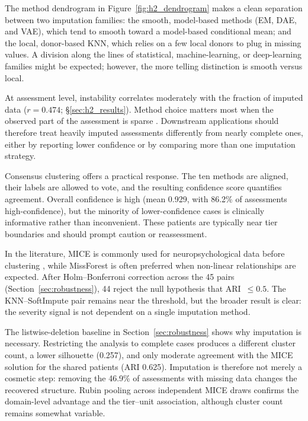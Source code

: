 The method dendrogram in Figure~\ref{fig:h2_dendrogram} makes a clean separation between two imputation families: the smooth, model-based methods (EM, DAE, and VAE), which tend to smooth toward a model-based conditional mean; and the local, donor-based KNN, which relies on a few local donors to plug in missing values. A division along the lines of statistical, machine-learning, or deep-learning families might be expected; however, the more telling distinction is smooth versus local.

At assessment level, instability correlates moderately with the fraction of imputed data ($r = 0.474$; §\ref{sec:h2_results}). Method choice matters most when the observed part of the assessment is sparse \parencite{little2019statistical}. Downstream applications should therefore treat heavily imputed assessments differently from nearly complete ones, either by reporting lower confidence or by comparing more than one imputation strategy.

Consensus clustering offers a practical response. The ten methods are aligned, their labels are allowed to vote, and the resulting confidence score quantifies agreement. Overall confidence is high (mean 0.929, with 86.2\% of assessments high-confidence), but the minority of lower-confidence cases is clinically informative rather than inconvenient. These patients are typically near tier boundaries and should prompt caution or reassessment.

In the literature, MICE is commonly used for neuropsychological data before clustering \parencite{vanbuuren2011mice}, while MissForest \parencite{stekhoven2012missforest} is often preferred when non-linear relationships are expected. After Holm--Bonferroni correction across the 45 pairs (Section~\ref{sec:robustness}), 44 reject the null hypothesis that ARI~$\le 0.5$. The KNN--SoftImpute pair remains near the threshold, but the broader result is clear: the severity signal is not dependent on a single imputation method.

The listwise-deletion baseline in Section~\ref{sec:robustness} shows why imputation is necessary. Restricting the analysis to complete cases produces a different cluster count, a lower silhouette (0.257), and only moderate agreement with the MICE solution for the shared patients (ARI 0.625). Imputation is therefore not merely a cosmetic step: removing the 46.9\% of assessments with missing data changes the recovered structure. Rubin pooling across independent MICE draws confirms the domain-level advantage and the tier--unit association, although cluster count remains somewhat variable.

